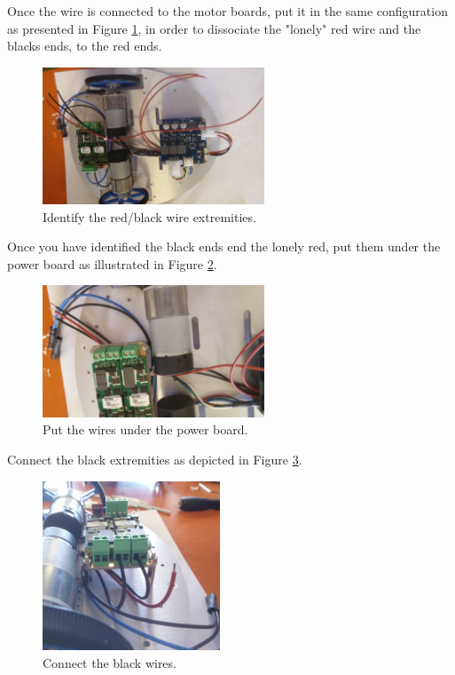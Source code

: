 \documentclass[10pt,a4paper]{report}   %
\begin{document}
Once the wire is connected to the motor boards, put it in the same configuration as presented in Figure \ref{fig:29}, in order to dissociate the "lonely" red wire and the blacks ends, to the red ends.
\begin{figure}[H]
\center
\includegraphics[width=250px]{images/29.jpg}
\caption{Identify the red/black wire extremities.}
\label{fig:29}
\end{figure}

 Once you have identified the black ends end the lonely red, put them under the power board as illustrated in Figure \ref{fig:30}. 

\begin{figure}[H]
\center
\includegraphics[width=250px]{images/30.jpg}
\caption{Put the wires under the power board.}
\label{fig:30}
\end{figure}

Connect the black extremities as depicted in Figure \ref{fig:31}.

\begin{figure}[H]
\center
\includegraphics[width=200px]{images/31.jpg}
\caption{Connect the black wires.}
\label{fig:31}
\end{figure}
\end{document}
